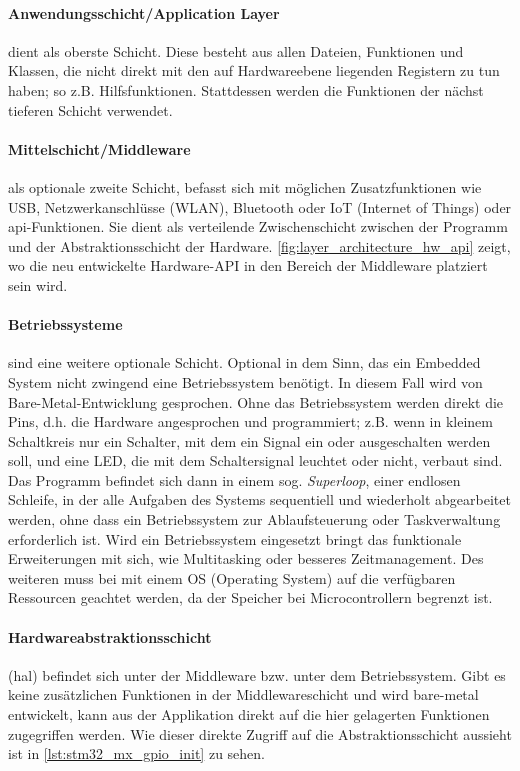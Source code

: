 \paragraph{Anwendungsschicht/Application Layer}
dient als oberste Schicht.
Diese besteht aus allen Dateien, Funktionen und Klassen, die nicht direkt mit den auf Hardwareebene liegenden Registern zu tun haben; so z.B. Hilfsfunktionen.
Stattdessen werden die Funktionen der nächst tieferen Schicht verwendet.

\paragraph{Mittelschicht/Middleware}
als optionale zweite Schicht, befasst sich mit möglichen Zusatzfunktionen wie USB, Netzwerkanschlüsse (WLAN), Bluetooth oder IoT (Internet of Things) oder \gls{api}-Funktionen.
Sie dient als verteilende Zwischenschicht zwischen der Programm und der Abstraktionsschicht der Hardware.
\cref{fig:layer_architecture_hw_api} zeigt, wo die neu entwickelte Hardware-API in den Bereich der Middleware platziert sein wird.


\paragraph{Betriebssysteme} sind eine weitere optionale Schicht.
Optional in dem Sinn, das ein Embedded System nicht zwingend eine Betriebssystem benötigt.
In diesem Fall wird von Bare-Metal-Entwicklung gesprochen.
Ohne das Betriebssystem werden direkt die Pins, d.h. die Hardware angesprochen und programmiert; z.B. wenn in kleinem Schaltkreis nur ein Schalter, mit dem ein Signal ein oder ausgeschalten werden soll, und eine LED, die mit dem Schaltersignal leuchtet oder nicht, verbaut sind.
Das Programm befindet sich dann in einem sog. \textit{Superloop}, einer endlosen Schleife, in der alle Aufgaben des Systems sequentiell und wiederholt abgearbeitet werden, ohne dass ein Betriebssystem zur Ablaufsteuerung oder Taskverwaltung erforderlich ist.
Wird ein Betriebssystem eingesetzt bringt das funktionale Erweiterungen mit sich, wie Multitasking oder besseres Zeitmanagement.
Des weiteren muss bei mit einem OS (Operating System) auf die verfügbaren Ressourcen geachtet werden, da der Speicher bei Microcontrollern begrenzt ist.

\paragraph{Hardwareabstraktionsschicht} (\gls{hal}) befindet sich unter der Middleware bzw. unter dem Betriebssystem.
Gibt es keine zusätzlichen Funktionen in der Middlewareschicht und wird bare-metal entwickelt, kann aus der Applikation direkt auf die hier gelagerten Funktionen zugegriffen werden.
Wie dieser direkte Zugriff auf die Abstraktionsschicht aussieht ist in \cref{lst:stm32_mx_gpio_init}
zu sehen.
\clearpage

